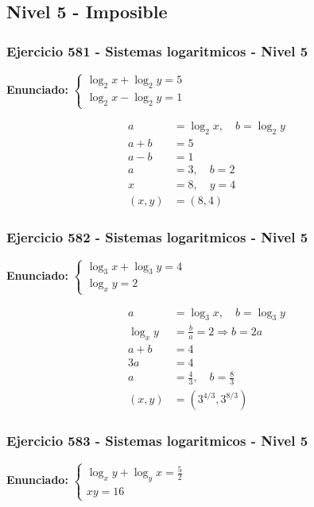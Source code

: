 \documentclass[12pt,a4paper]{article}
\begin{document}
\newpage

\subsection*{Nivel 5 - Imposible}

\subsubsection*{Ejercicio 581 - Sistemas logaritmicos - Nivel 5}
\textbf{Enunciado:} \(\begin{cases}\log_2x+\log_2y=5\\ \log_2x-\log_2y=1\end{cases}\)

\[
\begin{aligned}
a&=\log_2x,
\quad b=\log_2y\\
a+b&=5\\
a-b&=1\\
a&=3,
\quad b=2\\
x&=8,
\quad y=4\\
(x,y)&=\boxed{(8,4)}
\end{aligned}
\]


\subsubsection*{Ejercicio 582 - Sistemas logaritmicos - Nivel 5}
\textbf{Enunciado:} \(\begin{cases}\log_3x+\log_3y=4\\ \log_xy=2\end{cases}\)

\[
\begin{aligned}
a&=\log_3x,
\quad b=\log_3y\\
\log_xy&=\frac{b}{a}=2\Rightarrow b=2a\\
a+b&=4\\
3a&=4\\
a&=\frac43,
\quad b=\frac83\\
(x,y)&=\boxed{\left(3^{4/3},3^{8/3}\right)}
\end{aligned}
\]


\subsubsection*{Ejercicio 583 - Sistemas logaritmicos - Nivel 5}
\textbf{Enunciado:} \(\begin{cases}\log_xy+\log_yx=\frac52\\ xy=16\end{cases}\)
\end{document}
